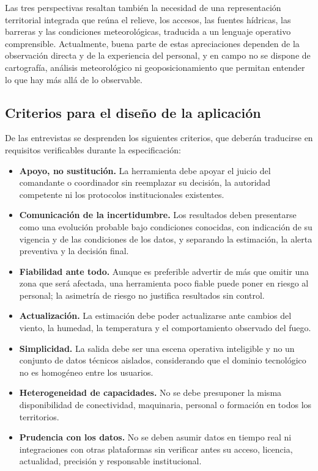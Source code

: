 Las tres perspectivas resaltan también la necesidad de una representación territorial integrada que reúna el relieve, los accesos, las fuentes hídricas, las barreras y las condiciones meteorológicas, traducida a un lenguaje operativo comprensible. Actualmente, buena parte de estas apreciaciones dependen de la observación directa y de la experiencia del personal, y en campo no se dispone de cartografía, análisis meteorológico ni geoposicionamiento que permitan entender lo que hay más allá de lo observable.

\subsection{Criterios para el diseño de la aplicación}

De las entrevistas se desprenden los siguientes criterios, que deberán traducirse en requisitos verificables durante la especificación:

\begin{itemize}
  \item \textbf{Apoyo, no sustitución.} La herramienta debe apoyar el juicio del comandante o coordinador sin reemplazar su decisión, la autoridad competente ni los protocolos institucionales existentes.
  \item \textbf{Comunicación de la incertidumbre.} Los resultados deben presentarse como una evolución probable bajo condiciones conocidas, con indicación de su vigencia y de las condiciones de los datos, y separando la estimación, la alerta preventiva y la decisión final.
  \item \textbf{Fiabilidad ante todo.} Aunque es preferible advertir de más que omitir una zona que será afectada, una herramienta poco fiable puede poner en riesgo al personal; la asimetría de riesgo no justifica resultados sin control.
  \item \textbf{Actualización.} La estimación debe poder actualizarse ante cambios del viento, la humedad, la temperatura y el comportamiento observado del fuego.
  \item \textbf{Simplicidad.} La salida debe ser una escena operativa inteligible y no un conjunto de datos técnicos aislados, considerando que el dominio tecnológico no es homogéneo entre los usuarios.
  \item \textbf{Heterogeneidad de capacidades.} No se debe presuponer la misma disponibilidad de conectividad, maquinaria, personal o formación en todos los territorios.
  \item \textbf{Prudencia con los datos.} No se deben asumir datos en tiempo real ni integraciones con otras plataformas sin verificar antes su acceso, licencia, actualidad, precisión y responsable institucional.
\end{itemize}

